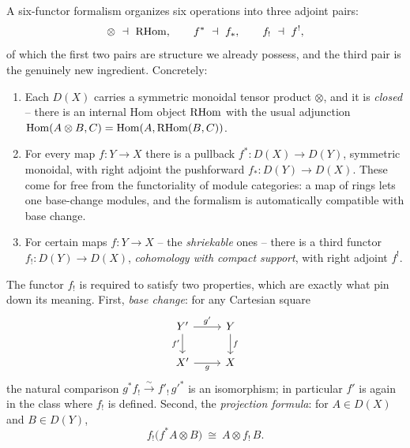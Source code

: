 \begin{remark}
\label{rmk:16:six-functors}
A six-functor formalism organizes six operations into three adjoint pairs:
\begin{equation*}
\otimes\ \dashv\ \RHom,\qquad f^*\ \dashv\ f_*,\qquad f_!\ \dashv\ f^!,
\end{equation*}
of which the first two pairs are structure we already possess, and the third pair
is the genuinely new ingredient. Concretely:
\begin{enumerate}
\item Each $D(X)$ carries a symmetric monoidal tensor product $\otimes$, and it is
\emph{closed} -- there is an internal Hom object $\mathrm{RHom}$ with the usual adjunction
$\operatorname{Hom}(A\otimes B,C)=\operatorname{Hom}(A,\mathrm{RHom}(B,C))$.
\item For every map $f\colon Y\to X$ there is a pullback $f^*\colon D(X)\to D(Y)$,
symmetric monoidal, with right adjoint the pushforward $f_*\colon D(Y)\to D(X)$.
These come for free from the functoriality of module categories: a map of rings lets
one base-change modules, and the formalism is automatically compatible with base
change.
\item For certain maps $f\colon Y\to X$ -- the \emph{shriekable} ones -- there is a
third functor $f_!\colon D(Y)\to D(X)$, \emph{cohomology with compact support}, with
right adjoint $f^!$.
\end{enumerate}
\end{remark}

\begin{remark}
\label{rmk:16:fshriek-properties}
The functor $f_!$ is required to satisfy two properties, which are exactly what pin
down its meaning. First, \emph{base change}: for any Cartesian square
\begin{equation*}
\begin{tikzcd}
Y' \arrow[r, "g'"] \arrow[d, "f'"'] & Y \arrow[d, "f"] \\
X' \arrow[r, "g"'] & X
\end{tikzcd}
\end{equation*}
the natural comparison $g^*f_!\xrightarrow{\ \sim\ }f'_!\,g'^*$ is an isomorphism;
in particular $f'$ is again in the class where $f_!$ is defined. Second, the
\emph{projection formula}: for $A\in D(X)$ and $B\in D(Y)$,
\begin{equation}
\label{eq:16:projection-formula}
f_!\bigl(f^*A\otimes B\bigr)\ \cong\ A\otimes f_!\,B.
\end{equation}
\end{remark}

